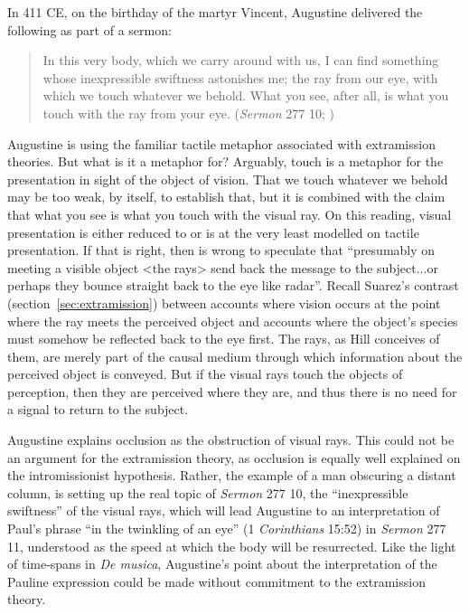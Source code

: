 \documentclass[12pt]{article}
\begin{document}
In 411 CE, on the birthday of the martyr Vincent, Augustine delivered the following as part of a sermon:
\begin{quote}
	In this very body, which we carry around with us, I can find something whose inexpressible swiftness astonishes me; the ray from our eye, with which we touch whatever we behold. What you see, after all, is what you touch with the ray from your eye. (\emph{Sermon} 277 10; \citealt[38]{Hill:1994aa})
\end{quote}
Augustine is using the familiar tactile metaphor associated with extramission theories. But what is it a metaphor for? Arguably, touch is a metaphor for the presentation in sight of the object of vision. That we touch whatever we behold may be too weak, by itself, to establish that, but it is combined with the claim that what you see is what you touch with the visual ray. On this reading, visual presentation is either reduced to or is at the very least modelled on tactile presentation. If that is right, then \citet[46 n.17]{Hill:1994aa} is wrong to speculate that ``presumably on meeting a visible object <the rays> send back the message to the subject...or perhaps they bounce straight back to the eye like radar''. Recall Suarez's contrast (section~\ref{sec:extramission}) between accounts where vision occurs at the point where the ray meets the perceived object and accounts where the object’s species must somehow be reflected back to the eye first. The rays, as Hill conceives of them, are merely part of the causal medium through which information about the perceived object is conveyed. But if the visual rays touch the objects of perception, then they are perceived where they are, and thus there is no need for a signal to return to the subject.

Augustine explains occlusion as the obstruction of visual rays. This could not be an argument for the extramission theory, as occlusion is equally well explained on the intromissionist hypothesis. Rather, the example of a man obscuring a distant column, is setting up the real topic of \emph{Sermon} 277 10, the ``inexpressible swiftness'' of the visual rays, which will lead Augustine to an interpretation of Paul's phrase ``in the twinkling of an eye'' (1 \emph{Corinthians} 15:52) in \emph{Sermon} 277 11, understood as the speed at which the body will be resurrected. Like the light of time-spans in \emph{De musica}, Augustine's point about the interpretation of the Pauline expression could be made without commitment to the extramission theory.
\end{document}
